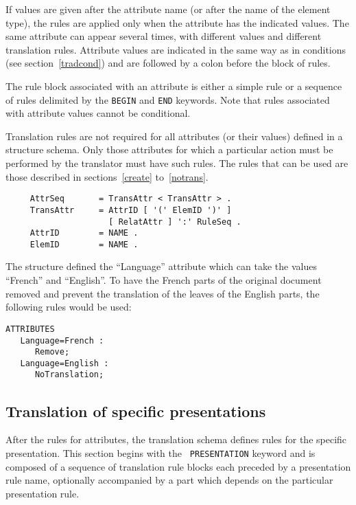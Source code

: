 If values are given after the attribute name (or after the name of
the element type), the rules are applied only when the attribute has
the indicated values.  The same attribute can appear several times,
with different values and different translation rules.  Attribute
values are indicated in the same way as in conditions (see
section~\ref{tradcond}) and are followed by a colon before the block
of rules.

The rule block associated with an attribute is either a simple rule or a
sequence of rules delimited by the {\tt BEGIN} and {\tt END} keywords.
Note that rules associated with attribute values cannot be
conditional.

Translation rules are not required for all attributes (or their
values) defined in a structure schema.  Only those attributes for
which a particular action must be performed by the translator must have such rules.  The
rules that can be used are those described in sections~\ref{create}
to~\ref{notrans}.

\begin{verbatim}
     AttrSeq       = TransAttr < TransAttr > .
     TransAttr     = AttrID [ '(' ElemID ')' ] 
                     [ RelatAttr ] ':' RuleSeq .
     AttrID        = NAME .
     ElemID        = NAME .
\end{verbatim}

\begin{example}
The structure defined the ``Language'' attribute which can take the
values ``French'' and ``English''.  To have the French parts of the
original document removed and prevent the translation of the leaves of the English
parts, the following rules would be used:
\begin{verbatim}
ATTRIBUTES
   Language=French :
      Remove;
   Language=English :
      NoTranslation;
\end{verbatim}
\end{example}

\subsection{Translation of specific presentations}
\label{prestrans}


After the rules for attributes, the translation schema defines rules
for the specific presentation.  This section begins with the {\tt
PRESENTATION} keyword and is composed of a sequence of translation
rule blocks each preceded by a presentation rule name, optionally
accompanied by a part which depends on the particular presentation
rule.

